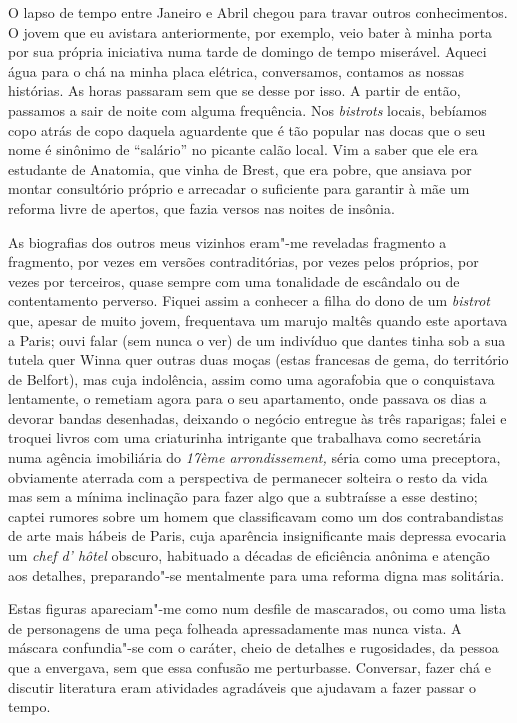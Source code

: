 O lapso de tempo entre Janeiro e Abril chegou para travar outros
conhecimentos. O jovem que eu avistara anteriormente, por exemplo,
veio bater à minha porta por sua própria iniciativa numa tarde de
domingo de tempo miserável. Aqueci água para o chá na minha placa
elétrica, conversamos, contamos as nossas histórias. As horas passaram
sem que se desse por isso. A partir de então, passamos a sair de noite
com alguma frequência. Nos \emph{bistrots }locais, bebíamos copo atrás
de copo daquela aguardente que é tão popular nas docas que o seu nome é
sinônimo de ``salário'' no picante calão local. Vim a saber que ele era
estudante de Anatomia, que vinha de Brest, que era pobre, que ansiava
por montar consultório próprio e arrecadar o suficiente para garantir à
mãe um reforma livre de apertos, que fazia versos nas noites de insônia.

As biografias dos outros meus vizinhos eram"-me reveladas fragmento a
fragmento, por vezes em versões contraditórias, por vezes pelos
próprios, por vezes por terceiros, quase sempre com uma tonalidade de
escândalo ou de contentamento perverso. Fiquei assim a conhecer a
filha do dono de um \emph{bistrot }que, apesar de muito jovem,
frequentava um marujo maltês quando este aportava a Paris; ouvi falar
(sem nunca o ver) de um indivíduo que dantes tinha sob a sua tutela quer
Winna quer outras duas moças (estas francesas de gema, do território de
Belfort), mas cuja indolência, assim como uma agorafobia que o
conquistava lentamente, o remetiam agora para o seu apartamento, onde
passava os dias a devorar bandas desenhadas, deixando o negócio
entregue às três raparigas; falei e troquei livros com uma criaturinha
intrigante que trabalhava como secretária numa agência imobiliária do \emph{17ème arrondissement, }séria como uma preceptora, obviamente aterrada com a
perspectiva de permanecer solteira o resto da vida mas sem a mínima
inclinação para fazer algo que a subtraísse a esse destino; captei
rumores sobre um homem que classificavam como um dos contrabandistas de
arte mais hábeis de Paris, cuja aparência insignificante mais depressa
evocaria um \emph{chef d' hôtel }obscuro, habituado a décadas de
eficiência anônima e atenção aos detalhes, preparando"-se mentalmente
para uma reforma digna mas solitária.

Estas figuras apareciam"-me como num desfile de mascarados, ou como uma
lista de personagens de uma peça folheada apressadamente mas nunca
vista. A máscara confundia"-se com o caráter, cheio de detalhes e
rugosidades, da pessoa que a envergava, sem que essa confusão me
perturbasse. Conversar, fazer chá e discutir literatura eram
atividades agradáveis que ajudavam a fazer passar o tempo.

